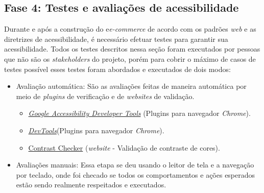 \subsection{Fase 4: Testes e avaliações de acessibilidade}
{Durante e após a construção do e\textit{e-commerce} de acordo com os
padrões \textit{web} e as diretrizes de acessibilidade, é necessário efetuar testes para garantir sua acessibilidade. Todos os testes descritos nessa seção foram executados por pessoas que não são os \textit{stakeholders} do projeto, porém para cobrir o máximo de casos de testes possível esses testes foram abordados e executados de dois modos: 
\begin{itemize}
\item Avaliação automática: São as avaliações feitas de maneira automática por meio de \textit{plugins} de verificação e de \textit{websites} de validação.
\begin{itemize}
    \item \href{https://chrome.google.com/webstore/detail/accessibility-developer-t/fpkknkljclfencbdbgkenhalefipecmb?hl=pt-BR}{\textit{Google Accessibility Developer Tools}} ({Plugins} para navegador \textit{Chrome}).
    \item \href{https://developer.chrome.com/docs/devtools/}{\textit{DevTools}}({Plugins} para navegador \textit{Chrome}).
    \item \href{https://contrastchecker.com/}{Contrast Checker} (\textit{website} - Validação de contraste de cores).
\end{itemize}
\item Avaliações manuais: Essa etapa se deu usando o leitor de tela e a navegação por teclado, onde foi checado se todos os comportamentos e ações esperados estão sendo realmente respeitados e executados.
\end{itemize}
}

